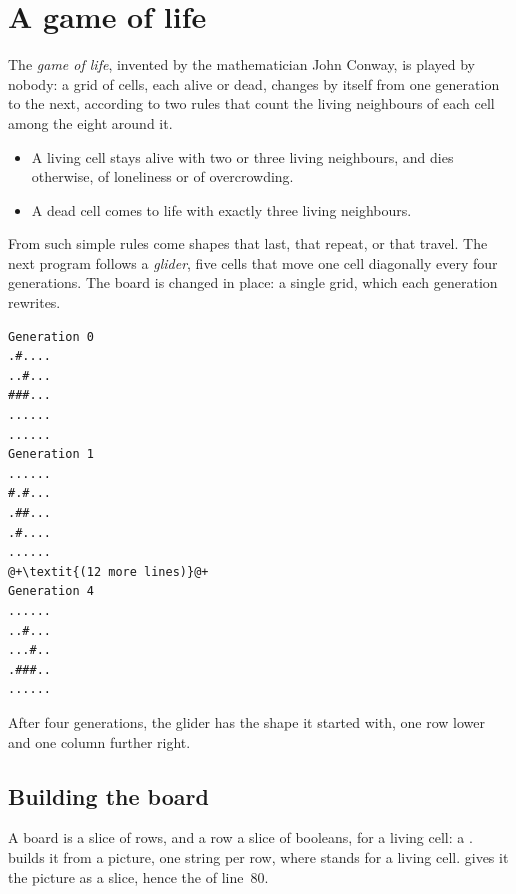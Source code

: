 \vfill\pagebreak
\section{A game of life}
\label{sec:mutability:life}

The \textit{game of life}, invented by the mathematician John Conway, is played
by nobody: a grid of cells, each alive or dead, changes by itself from one
generation to the next, according to two rules that count the living
neighbours of each cell among the eight around it.

\begin{itemize}
\item A living cell stays alive with two or three living neighbours, and dies
  otherwise, of loneliness or of overcrowding.
\item A dead cell comes to life with exactly three living neighbours.
\end{itemize}

From such simple rules come shapes that last, that repeat, or that travel. The
next program follows a \textit{glider}, five cells that move one cell
diagonally every four generations. The board is changed in place: a single
grid, which each generation rewrites.


\vspace{-10pt}%
\begin{lstlisting}[style=bashVerb, escapechar=@+]
Generation 0
.#....
..#...
###...
......
......
Generation 1
......
#.#...
.##...
.#....
......
@+\textit{(12 more lines)}@+
Generation 4
......
..#...
...#..
.###..
......
\end{lstlisting}

After four generations, the glider has the shape it started with, one row lower
and one column further right.

\subsection{Building the board}

A board is a slice of rows, and a row a slice of booleans,  for a
living cell: a \token{[[bool]]}.  builds it from a picture, one
string per row, where  stands for a living cell.  gives
it the picture as a slice, hence the  of line~80.

